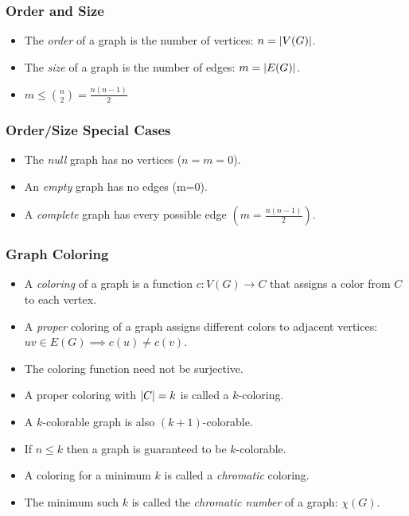 \documentclass{beamer}
\newcommand{\X}{\chi}
\DeclarePairedDelimiter{\abs}{\lvert}{\rvert}
\begin{document}
\begin{frame}
  \frametitle{Order and Size}
  \begin{itemize}
  \item The \emph{order} of a graph is the number of vertices: \(n=\abs{V(G)}\).
  \item The \emph{size} of a graph is the number of edges: \(m=\abs{E(G)}\).
  \item \(\displaystyle m\le\binom{n}{2}=\frac{n(n-1)}{2}\)
  \end{itemize}
\end{frame}

\begin{frame}
  \frametitle{Order/Size Special Cases}
  \begin{itemize}
  \item The \emph{null} graph has no vertices (\(n=m=0\)).
  \item An \emph{empty} graph has no edges (m=0).
  \item A \emph{complete} graph has every possible edge \(\displaystyle\left(m=\frac{n(n-1)}{2}\right)\).
  \end{itemize}
\end{frame}

\begin{frame}
  \frametitle{Graph Coloring}
  \begin{itemize}
  \item A \emph{coloring} of a graph is a function \(c:V(G)\to C\) that assigns a color from \(C\) to each vertex.
  \item A \emph{proper} coloring of a graph assigns different colors to adjacent vertices:
    \(uv\in E(G)\implies c(u)\ne c(v)\).
  \item The coloring function need not be surjective.
  \item A proper coloring with \(\abs{C}=k\) is called a \(k\)-coloring.
  \item A \(k\)-colorable graph is also \((k+1)\)-colorable.
  \item If \(n\le k\) then a graph is guaranteed to be \(k\)-colorable.
  \item A coloring for a minimum \(k\) is called a \emph{chromatic} coloring.
  \item The minimum such \(k\) is called the \emph{chromatic number} of a graph: \(\X(G)\).
  \end{itemize}
\end{frame}
\end{document}
